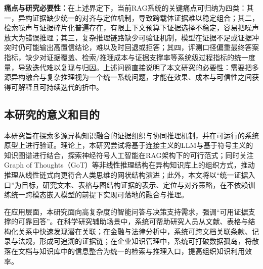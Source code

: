 \textbf{痛点与研究必要性：}在上述界定下，当前RAG系统的关键痛点可归纳为四类：其一，异构证据缺少统一的对齐与定位机制，导致跨载体证据难以稳定组合；其二，检索噪声与证据碎片化普遍存在，有限上下文预算下证据选择不稳定，容易把噪声放大为错误推理；其三，复杂推理链路缺少可验证机制，模型在证据不足或证据冲突时仍可能输出高置信结论，难以及时回退或拒答；其四，评测口径偏重最终答案指标，缺少对证据覆盖、检索/推理成本与证据支撑率等系统级过程指标的统一度量，导致迭代难以复现与归因。上述问题直接说明了本文研究的必要性：需要把多源异构融合与复杂推理视为一个统一系统问题，才能在效果、成本与可信性之间获得可解释且可持续迭代的折中。

\subsection{本研究的意义和目的}

本研究旨在探索多源异构知识融合的证据组织与协同推理机制，并在可运行的系统原型上进行验证。理论上，本研究尝试将基于连接主义的LLM与基于符号主义的知识图谱进行结合，探索神经符号人工智能在RAG架构下的可行范式；同时关注Graph of Thoughts（GoT）\cite{ref5}等非线性推理结构在异构知识库上的组织方式，推动推理从线性链式向更符合人类思维的网状结构演进；此外，本文将以“统一证据入口”为目标，研究文本、表格与图结构证据的表示、定位与对齐策略，在不依赖训练统一跨模态嵌入模型的前提下实现可落地的融合与推理。

在应用层面，本研究面向高复杂度的智能问答与决策支持需求，强调“可用证据支撑的可靠回答”。在科学研究辅助场景中，系统可帮助研究人员从文献、表格与结构化关系中快速发现潜在关联；在金融与法律分析中，系统可跨文档关联条款、记录与法规，形成可追溯的证据链；在企业知识管理中，系统可打破数据孤岛，将散落在文档与知识库中的信息整合为统一的检索与推理入口，提高组织知识利用效率。
